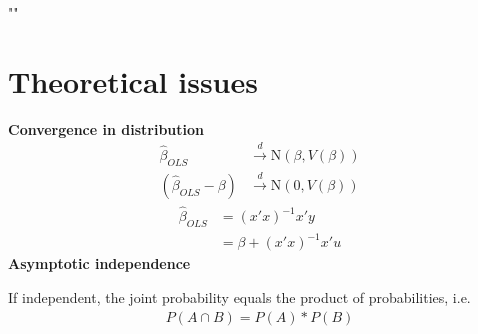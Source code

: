 \epigraph{""}
{\textit{}}

\section{Theoretical issues}
\begin{multicols}{2}
 \noindent
 \textbf{Convergence in distribution}
 \begin{align*}
  \hat{\beta}_{OLS}         & \xrightarrow{d} \textrm{N}(\beta,V(\beta)) \\
  (\hat{\beta}_{OLS}-\beta) & \xrightarrow{d} \textrm{N}(0,V(\beta))
 \end{align*}
 \begin{align*}
  \hat{\beta}_{OLS} & = (x'x)^{-1}x'y         \\
                    & = \beta + (x'x)^{-1}x'u
 \end{align*}\noindent
 \textbf{Asymptotic independence}\par
 If independent, the joint probability equals the product of probabilities, i.e.
 \begin{align*}
  P(A\cap B) = P(A)*P(B)
 \end{align*}
\end{multicols}


